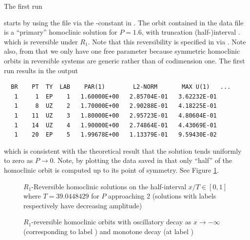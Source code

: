 \documentclass[12pt]{report}
\begin{document}
The first run
\begin{center}
\end{center}
starts by using the file  via the
 \AUTO-constant in .
The orbit contained in
the data file is a ``primary'' homoclinic solution for $P=1.6$, with
truncation (half-)interval .
which is reversible under $R_1$. Note that this reversibility is
specified in  via . Note also, from
 that we only have one free parameter 
because symmetric homoclinic orbits in reversible systems are
generic rather than of codimension one.
The first run  results in the output
\begin{verbatim}
  BR    PT  TY  LAB    PAR(1)        L2-NORM       MAX U(1)   ...
   1     1  EP    1   1.60000E+00   2.85704E-01   3.62232E-01
   1     8  UZ    2   1.70000E+00   2.90288E-01   4.18225E-01
   1    11  UZ    3   1.80000E+00   2.95723E-01   4.80604E-01
   1    14  UZ    4   1.90000E+00   2.74864E-01   4.43069E-01
   1    20  EP    5   1.99678E+00   1.13379E-01   9.59430E-02
\end{verbatim}
which is consistent with the theoretical result that the solution
tends uniformly to zero as $P\to 0$. Note, by plotting the data
saved in  that only ``half'' of the 
homoclinic orbit is computed up to its point of symmetry. See Figure
\ref{Frev1}.

\begin{figure}[p]
\epsfysize 9.0cm
\centerline{}
\caption{$R_1$-Reversible homoclinic solutions on the half-interval
$x/T \in [0,1]$ where $T=39.0448429$ for $P$ approaching $2$ (solutions
with labels  respectively have decreasing amplitude)}
\label{Frev1}
\end{figure}
\begin{figure}[p]
\epsfysize 9.0cm
\centerline{}
\caption{$R_1$-reversible homoclinic orbits with oscillatory decay 
as $x \to -\infty$ (corresponding to label ) and monotone decay 
(at label )}
\label{Frev2}
\end{figure}
\end{document}
